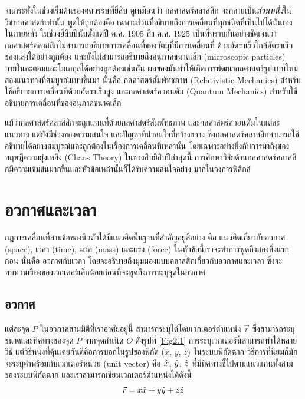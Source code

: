 จนกระทั่งในช่วงเริ่มต้นของศตวรรษที่ยี่สิบ ดูเหมือนว่า กลศาสตร์คลาสสิก จะกลายเป็น\textit{ส่วนหนึ่ง}ในวิชากลศาสตร์เท่านั้น พูดให้ถูกต้องคือ เฉพาะส่วนที่อธิบายถึงการเคลื่อนที่ทุกชนิดที่เป็นไปได้นั่นเอง ในภายหลัง ในช่วงยี่สิบปีนับตั้งแต่ปี ค.ศ. 1905 ถึง ค.ศ. 1925 เป็นที่ทราบกันอย่างชัดเจนว่ากลศาสตร์คลาสสิกไม่สามารถอธิบายการเคลื่อนที่ของวัตถุที่มีการเคลื่อนที่
ด้วยอัตราเร็วใกล้อัตราเร็วของแสงได้อย่างถูกต้อง และยังไม่สามารถอธิบายถึงอนุภาคขนาดเล็ก (microscopic particles) ภายในอะตอมและโมเลกุลได้อย่างถูกต้องเช่นกัน ผลของมันทำให้เกิดการพัฒนากลศาสตร์รูปแบบใหม่สองแนวทางที่สมบูรณ์แบบขึ้นมา นั่นคือ กลศาสตร์สัมพัทธภาพ (Relativistic Mechanics) สำหรับใช้อธิบายการเคลื่อนที่ด้วยอัตราเร็วสูง และกลศาสตร์ควอนตัม (Quantum Mechanics) สำหรับใช้อธิบายการเคลื่อนที่ของอนุภาคขนาดเล็ก 

แม้ว่ากลศาสตร์คลาสสิกจะถูกแทนที่ด้วยกลศาสตร์สัมพัทธภาพ และกลศาสตร์ควอนตัมในแต่ละแนวทาง แต่ยังมีช่วงของความสนใจ และปัญหาที่น่าสนใจที่กว้างขวาง ซึ่งกลศาสตร์คลาสสิกสามารถใช้อธิบายได้อย่างสมบูรณ์และถูกต้องในเรื่องการเคลื่อนที่เหล่านั้น โดยเฉพาะอย่างยิ่งกับการมาถึงของทฤษฎีความยุ่งเหยิง (Chaos Theory) ในช่วงสิบยี่สิบปีล่าสุดนี้ การศึกษาวิจัยด้านกลศาสตร์คลาสสิกมีความเข้มข้นมากขึ้นและหัวข้อเหล่านั้นก็ได้รับความสนใจอย่าง
มากในวงการฟิสิกส์

\section{อวกาศและเวลา}
\label{Sec:SpaceAndTime}

กฎการเคลื่อนที่สามข้อของนิวตัวได้มีแนวคิดพื้นฐานที่สำคัญอยู่สี่อย่าง คือ แนวคิดเกี่ยวกับอวกาศ (space), เวลา (time), มวล (mass) และแรง (force) ในหัวข้อนี้เราจะทำการพูดถึงสองสิ่งแรกก่อน นั่นคือ อวกาศกับเวลา โดยจะอธิบายถึงมุมมองแบบคลาสสิกเกี่ยวกับอวกาศและเวลา ซึ่งจะทบทวนเรื่องของเวกเตอร์เล็กน้อยก่อนที่จะพูดถึงการระบุจุดในอวกาศ

\subsection{อวกาศ}
\label{SubSec:Space}

แต่ละจุด $P$ ในอวกาศสามมิติที่เราอาศัยอยู่นี้ สามารถระบุได้โดยเวกเตอร์ตำแหน่ง $\vec{r}$ ซึ่งสามารถระบุขนาดและทิศทางของจุด $P$ จากจุดกำเนิด $O$ ดังรูปที่ \ref{Fig2.1} การระบุเวกเตอร์นี้สามารถทำได้หลายวิธี แต่วิธีหนึ่งที่คุ้นเคยกันดีคือการบอกในรูปของพิกัด ($x$, $y$, $z$) ในระบบพิกัดฉาก วิธีการที่นิยมก็มักจะระบุค่าพร้อมกับเวกเตอร์หน่วย (unit vector) คือ $\hat{x}$, $\hat{y}$, $\hat{z}$ ที่มีทิศทางชี้ไปตามแนวแกนทั้งสามของระบบพิกัดฉาก และเราสามารถเขียนเวกเตอร์ตำแหน่งได้ดังนี้
\begin{equation}\label{Eqn:PosVecR}
\vec{r} = x\hat{x} + y\hat{y} + z\hat{z}
\end{equation}

